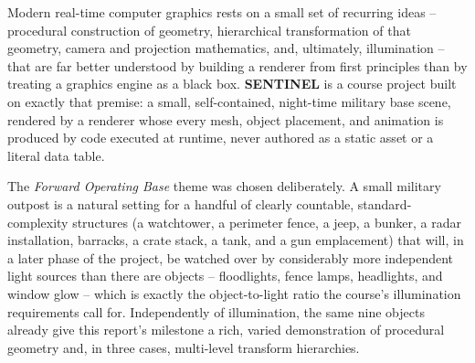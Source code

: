 \documentclass[11pt,a4paper]{article}
\begin{document}
Modern real-time computer graphics rests on a small set of recurring
ideas -- procedural construction of geometry, hierarchical transformation
of that geometry, camera and projection mathematics, and, ultimately,
illumination -- that are far better understood by building a renderer
from first principles than by treating a graphics engine as a black box.
\textbf{SENTINEL} is a course project built on exactly that premise: a
small, self-contained, night-time military base scene, rendered by a
renderer whose every mesh, object placement, and animation is produced by
code executed at runtime, never authored as a static asset or a literal
data table.

The \emph{Forward Operating Base} theme was chosen deliberately. A small
military outpost is a natural setting for a handful of clearly countable,
standard-complexity structures (a watchtower, a perimeter fence, a jeep,
a bunker, a radar installation, barracks, a crate stack, a tank, and a
gun emplacement) that will, in a later phase of the project, be watched
over by considerably more independent light sources than there are
objects -- floodlights, fence lamps, headlights, and window glow -- which
is exactly the object-to-light ratio the course's illumination
requirements call for. Independently of illumination, the same nine
objects already give this report's milestone a rich, varied
demonstration of procedural geometry and, in three cases, multi-level
transform hierarchies.
\end{document}
